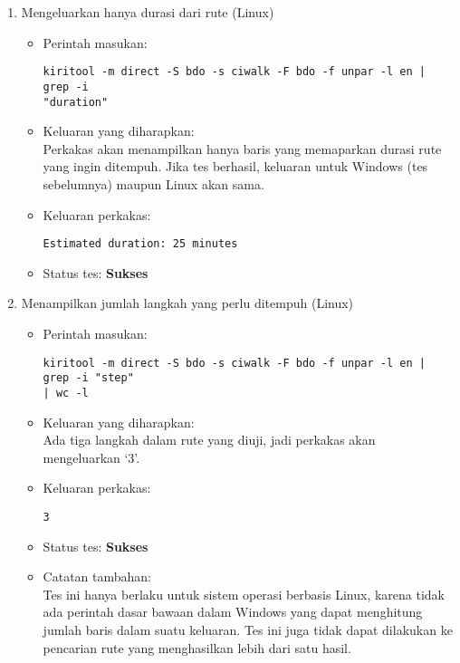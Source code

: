 \begin{enumerate}
	\item Mengeluarkan hanya durasi dari rute (Linux)
	\begin{itemize}
		\item Perintah masukan:
		\begin{verbatim}
kiritool -m direct -S bdo -s ciwalk -F bdo -f unpar -l en | grep -i
"duration"
		\end{verbatim}
		\item Keluaran yang diharapkan: \\
		Perkakas akan menampilkan hanya baris yang memaparkan durasi rute yang ingin ditempuh. Jika tes berhasil, keluaran untuk Windows (tes sebelumnya) maupun Linux akan sama.
		\item Keluaran perkakas:
		\begin{lstlisting}
Estimated duration: 25 minutes
		\end{lstlisting}
		\item Status tes: \textbf{Sukses}
	\end{itemize}
	
	\item Menampilkan jumlah langkah yang perlu ditempuh (Linux)
	\begin{itemize}
		\item Perintah masukan:
		\begin{verbatim}
kiritool -m direct -S bdo -s ciwalk -F bdo -f unpar -l en | grep -i "step"
| wc -l
		\end{verbatim}
		\item Keluaran yang diharapkan: \\
Ada tiga langkah dalam rute yang diuji, jadi perkakas akan mengeluarkan `3'.
		\item Keluaran perkakas:
		\begin{lstlisting}
3
		\end{lstlisting}
		\item Status tes: \textbf{Sukses}
		\item Catatan tambahan: \\
		Tes ini hanya berlaku untuk sistem operasi berbasis Linux, karena tidak ada perintah dasar bawaan dalam \cl Windows yang dapat menghitung jumlah baris dalam suatu keluaran. Tes ini juga tidak dapat dilakukan ke pencarian rute yang menghasilkan lebih dari satu hasil.
	\end{itemize}
	
\end{enumerate}
